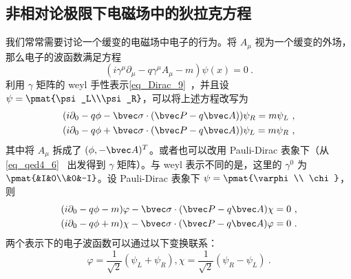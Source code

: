 \subsection{非相对论极限下电磁场中的狄拉克方程}\label{sub_DiracE_1}
我们常常需要讨论一个缓变的电磁场中电子的行为。将 $A_\mu$ 视为一个缓变的外场，那么电子的波函数满足方程
\begin{equation}\label{eq_DiracE_4}
(i\gamma^\mu \partial_\mu -q\gamma^\mu A_\mu - m)\psi(x)=0~.
\end{equation}
利用 $\gamma$ 矩阵的 weyl 手性表示\autoref{eq_Dirac_9}~，并且设 $\psi = \pmat{\psi_L\\\psi_R}$，可以将上述方程改写为
\begin{equation}
\begin{aligned}
&(i\partial_0 - q\phi-\bvec \sigma\cdot (\bvec P-q\bvec A))\psi_R=m\psi_L~,\\
&(i\partial_0-q\phi+\bvec \sigma\cdot (\bvec P-q\bvec A))\psi_L = m\psi_R~,
\end{aligned}
\end{equation}
其中将 $A_\mu$ 拆成了 $(\phi,-\bvec A)^T$。或者也可以改用 Pauli-Dirac 表象下（从 \autoref{eq_qed4_6}~ 出发得到 $\gamma$ 矩阵）。与 weyl 表示不同的是，这里的 $\gamma^0$ 为 $\pmat{&I&0\\&0&-I}$。设 Pauli-Dirac 表象下 $\psi=\pmat{\varphi\\ \chi}$，则
\begin{equation}\label{eq_DiracE_1}
\begin{aligned}
&(i\partial_0-q\phi-m)\varphi-\bvec \sigma\cdot (\bvec P-q\bvec A)\chi=0~,\\
&(i\partial_0-q\phi+m)\chi-\bvec \sigma\cdot (\bvec P-q\bvec A)\varphi=0~.
\end{aligned}
\end{equation}
两个表示下的电子波函数可以通过以下变换联系：
\begin{equation}
\varphi = \frac{1}{\sqrt{2}}(\psi_L+\psi_R),\chi = \frac{1}{\sqrt{2}}(\psi_R-\psi_L)~.
\end{equation}

